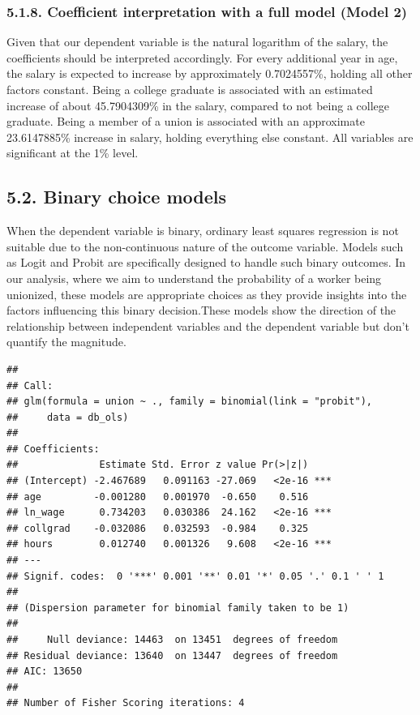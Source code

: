 \documentclass[
]{article}
\begin{document}
\subsubsection{5.1.8. Coefficient interpretation with a full model
(Model 2)}\label{coefficient-interpretation-with-a-full-model-model-2}

Given that our dependent variable is the natural logarithm of the
salary, the coefficients should be interpreted accordingly. For every
additional year in age, the salary is expected to increase by
approximately 0.7024557\%, holding all other factors constant. Being a
college graduate is associated with an estimated increase of about
45.7904309\% in the salary, compared to not being a college graduate.
Being a member of a union is associated with an approximate 23.6147885\%
increase in salary, holding everything else constant. All variables are
significant at the 1\% level.

\subsection{5.2. Binary choice models}\label{binary-choice-models}

When the dependent variable is binary, ordinary least squares regression
is not suitable due to the non-continuous nature of the outcome
variable. Models such as Logit and Probit are specifically designed to
handle such binary outcomes. In our analysis, where we aim to understand
the probability of a worker being unionized, these models are
appropriate choices as they provide insights into the factors
influencing this binary decision.These models show the direction of the
relationship between independent variables and the dependent variable
but don't quantify the magnitude.

\begin{verbatim}
## 
## Call:
## glm(formula = union ~ ., family = binomial(link = "probit"), 
##     data = db_ols)
## 
## Coefficients:
##              Estimate Std. Error z value Pr(>|z|)    
## (Intercept) -2.467689   0.091163 -27.069   <2e-16 ***
## age         -0.001280   0.001970  -0.650    0.516    
## ln_wage      0.734203   0.030386  24.162   <2e-16 ***
## collgrad    -0.032086   0.032593  -0.984    0.325    
## hours        0.012740   0.001326   9.608   <2e-16 ***
## ---
## Signif. codes:  0 '***' 0.001 '**' 0.01 '*' 0.05 '.' 0.1 ' ' 1
## 
## (Dispersion parameter for binomial family taken to be 1)
## 
##     Null deviance: 14463  on 13451  degrees of freedom
## Residual deviance: 13640  on 13447  degrees of freedom
## AIC: 13650
## 
## Number of Fisher Scoring iterations: 4
\end{verbatim}
\end{document}

